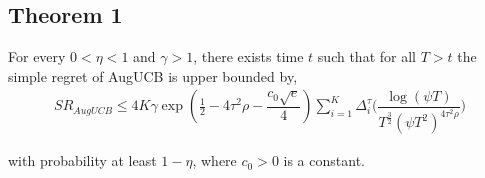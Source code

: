 \subsection{Theorem 1}

\begin{theorem}
\label{Result:Theorem:1}

For every $0<\eta <1$ and $\gamma > 1$, there exists time $t$ such that for all $T>t$ the simple regret of AugUCB is upper bounded by,
\begin{align*}
SR_{AugUCB} \leq 4K \gamma \exp(\frac{1}{2}- 4\tau^{2}\rho -\dfrac{c_{0}\sqrt{e}}{4}) \sum_{i=1}^{K} \Delta_{i}^{\tau} \bigg(\dfrac{\log (\psi T )}{T^{\frac{3}{2}}(\psi T^2)^{4\tau^{2}\rho}}\bigg)
\end{align*}

with probability at least $1-\eta$, where $c_{0}>0$ is a constant.

\end{theorem}



